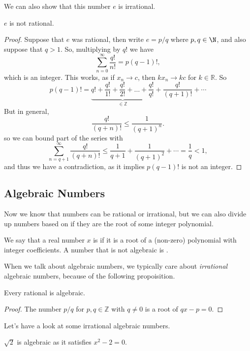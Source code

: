 \documentclass[a4paper]{scrartcl}
\begin{document}
We can also show that this number $e$ is irrational.

\begin{theorem}[Irrationality of $e$]
	$e$ is not rational.
\end{theorem}
\begin{proof}
	Suppose that $e$ was rational, then write $e = p/q$ where $p, q \in \N$, and also suppose that $q > 1$. So, multiplying by $q!$ we have
	$$
\sum_{n = 0}^{\infty} \frac{q!}{n!} = p(q - 1)!,
	$$
	which is an integer. This works, as if $x_n \rightarrow c$, then $k x_n \rightarrow kc$ for $k \in \mathbb{R}$. So
	$$
	p(q - 1)! = \underbrace{q! + \frac{q!}{1!}+ \frac{q!}{2!} + \dots +\frac{q!}{q!}}_{\in \mathbb{Z}} + \frac{q!}{(q+1)!} + \cdots
	$$
	But in general,
	$$
	\frac{q!}{(q + n)!} \leq \frac{1}{(q + 1)^n}.
	$$
	so we can bound part of the series with
	$$
	\sum_{n = q + 1}^\infty \frac{q!}{(q + n)!} \leq \frac{1}{q + 1} + \frac{1}{(q + 1)^2} + \cdots = \frac{1}{q} < 1,
	$$
	and thus we have a contradiction, as it implies $p(q - 1)!$ is not an integer.
\end{proof}

\subsection{Algebraic Numbers}

Now we know that numbers can be rational or irrational, but we can also divide up numbers based on if they are the root of some integer polynomial.

\begin{definition}[Algebraic]
We say that a real number $x$ is  if it is a root of a (non-zero) polynomial with integer coefficients. A number that is not algebraic is .	
\end{definition}

When we talk about algebraic numbers, we typically care about \emph{irrational} algebraic numbers, because of the following propoisition.

\begin{proposition}
	Every rational is algebraic.
\end{proposition}
\begin{proof}
	The number $p/q$ for $p, q \in \mathbb{Z}$ with $q \neq 0$ is a root of $qx - p = 0$.
\end{proof}

Let's have a look at some irrational algebraic numbers.

\begin{example}
	$\sqrt{2}$ is algebraic as it satisfies $x^2 - 2 = 0$.
\end{example}
\end{document}
